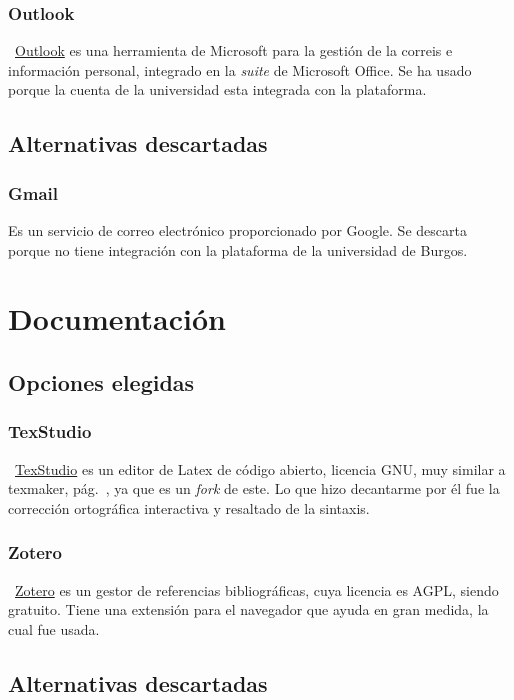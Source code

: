 \subsubsection{Outlook}
~\href{https://www.microsoft.com/es-es/microsoft-365/outlook/email-and-calendar-software-microsoft-outlook}{Outlook} es una herramienta de Microsoft para la gestión de la correis e información personal, integrado en la \emph{suite} de Microsoft Office. Se ha usado porque la cuenta de la universidad esta integrada con la plataforma.

\subsection{Alternativas descartadas}

\subsubsection{Gmail}
Es un servicio de correo electrónico proporcionado por Google. Se descarta porque no tiene integración con la plataforma de la universidad de Burgos.

\section{Documentación}

\subsection{Opciones elegidas}

\subsubsection{TexStudio}
~\href{https://www.texstudio.org/}{TexStudio} es un editor de Latex de código abierto, licencia GNU, muy similar a texmaker, pág.~\pageref{textmaker}, ya que es un \emph{fork} de este. Lo que hizo decantarme por él fue la corrección ortográfica interactiva y resaltado de la sintaxis.

\subsubsection{Zotero}
~\href{https://www.zotero.org/}{Zotero} es un gestor de referencias bibliográficas, cuya licencia es AGPL, siendo gratuito. Tiene una extensión para el navegador que ayuda en gran medida, la cual fue usada.

\subsection{Alternativas descartadas}

